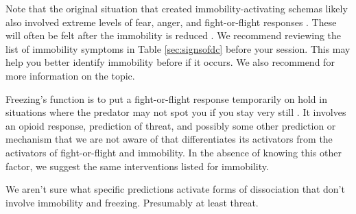 \documentclass[12pt,letterpaper]{book}
\begin{document}
Note that the original situation that created immobility-activating schemas likely also involved extreme levels of fear, anger, and fight-or-flight responses \cite{kozlowskaDefenseCascade}. These will often be felt after the immobility is reduced \cite{razviPSIP}. We recommend reviewing the list of immobility symptoms in Table \ref{sec:signsofdc} before your session. This may help you better identify immobility before if it occurs. We also recommend \textcite{razviDissociation} for more information on the topic.

Freezing's function is to put a fight-or-flight response temporarily on hold in situations where the predator may not spot you if you stay very still \cite{kozlowskaDefenseCascade}. It involves an opioid response, prediction of threat, and possibly some other prediction or mechanism that we are not aware of that differentiates its activators from the activators of fight-or-flight and immobility. In the absence of knowing this other factor, we suggest the same interventions listed for immobility.

We aren't sure what specific predictions activate forms of dissociation that don't involve immobility and freezing. Presumably at least threat.
\end{document}
